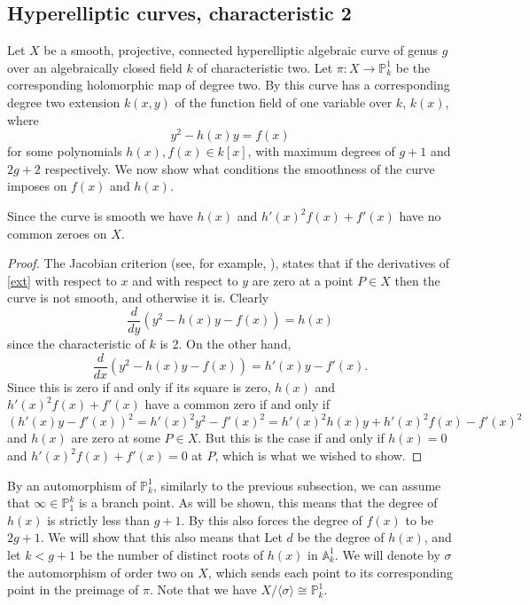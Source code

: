 \subsection{Hyperelliptic curves, characteristic 2}
Let $X$ be a smooth, projective, connected hyperelliptic algebraic curve of genus $g$ over an algebraically closed field $k$ of characteristic two.
Let $\pi:X \rightarrow \mathbb P_k^1$ be the corresponding holomorphic map of degree two.
By \cite[Prop. 7.4.24]{liu} this curve has a corresponding degree two extension $k(x,y)$ of the function field of one variable over $k$, $k(x)$, where
    \begin{equation}\label{ext}
    y^2 - h(x)y = f(x)
    \end{equation}
for some polynomials $h(x), f(x)\in k[x]$, with maximum degrees of $g+1$ and $2g+2$ respectively.
We now show what conditions the smoothness of the curve imposes on $f(x)$ and $h(x)$.



    \begin{lem}\label{smoothness}
    Since the curve is smooth we have $h(x)$ and $h'(x)^2 f(x) + f'(x)$ have no common zeroes on $X$.
    \end{lem}
    \begin{proof}
    The Jacobian criterion (see, for example, \cite[Thm. 4.2.19]{liu}), states that if the derivatives of \eqref{ext} with respect to $x$ and with respect to $y$ are zero at a point $P\in X$ then the curve is not smooth, and otherwise it is.
    Clearly
        \[
        \frac{d}{dy} (y^2 -h(x)y -f(x)) = h(x)
        \]
    since the characteristic of $k$ is 2.
    On the other hand,
        \[
        \frac{d}{dx} (y^2 - h(x)y -f(x)) = h'(x)y - f'(x).
        \]
    Since this is zero if and only if its square is zero, $h(x)$ and $h'(x)^2 f(x) + f'(x)$ have a common zero if and only if
        \[
        (h'(x)y-f'(x))^2 = h'(x)^2y^2 -f'(x)^2 = h'(x)^2h(x)y + h'(x)^2f(x) - f'(x)^2
        \]
    and $h(x)$ are zero at some $P\in X$.
    But this is the case if and only if $h(x) = 0$ and $h'(x)^2f(x) + f'(x) = 0$ at $P$, which is what we wished to show.
    \end{proof}

By an automorphism of $\mathbb P_k^1$, similarly to the previous subsection, we can assume that $\infty\in \mathbb P_1^k$ is a branch point.
As will be shown, this means that the degree of $h(x)$ is strictly less than $g+1$.
By \cite[Prop. 7.4.24]{liu} this also forces the degree of $f(x)$ to be $2g+1$.
We will show that this also means that
Let $d$ be the degree of $h(x)$, and let $k< g+1$ be the number of distinct roots of $h(x)$ in $\mathbb A_k^1$.
We will denote by $\sigma$ the automorphism of order two on $X$, which sends each point to its corresponding point in the preimage of $\pi$. 
Note that we have $X/\langle \sigma \rangle \cong \mathbb P_k^1$.


